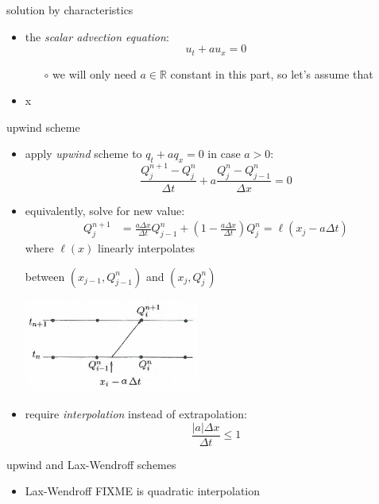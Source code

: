 \documentclass[10pt,hyperref]{beamer}
\newcommand{\RR}{\mathbb{R}}
\begin{document}
\begin{frame}{solution by characteristics}

\begin{itemize}
\item the \emph{scalar advection equation}:
    $$u_t + a u_x=0$$
    \begin{itemize}
    \item[$\circ$] we will only need $a\in\RR$ constant in this part, so let's assume that
    \end{itemize}
\item x
\end{itemize}
\end{frame}


\begin{frame}{upwind scheme}

\begin{itemize}
\item apply \emph{upwind} scheme to $q_t + aq_x=0$ in case $a>0$:
    $$\frac{Q_j^{n+1} - Q_j^n}{\Delta t} + a \frac{Q_j^n - Q_{j-1}^n}{\Delta x} = 0$$
\item equivalently, solve for new value:
\begin{align*}
Q_j^{n+1} &= \frac{a\Delta x}{\Delta t} Q_{j-1}^n + \left(1 - \frac{a\Delta x}{\Delta t}\right) Q_j^n = \ell(x_j-a\Delta t)
\end{align*}
where $\ell(x)$ linearly interpolates

\noindent between $(x_{j-1},Q_{j-1}^n)$ and $(x_{j},Q_{j}^n)$

\vspace{-10mm}
\hfill \includegraphics[width=0.45\textwidth]{figs/leveque4p4a}
\item require \emph{interpolation} instead of extrapolation:
    $$\frac{|a|\Delta x}{\Delta t} \le 1$$
\end{itemize}
\end{frame}


\begin{frame}{upwind and Lax-Wendroff schemes}

\begin{itemize}
\item Lax-Wendroff FIXME is quadratic interpolation
\end{itemize}
\end{frame}
\end{document}
